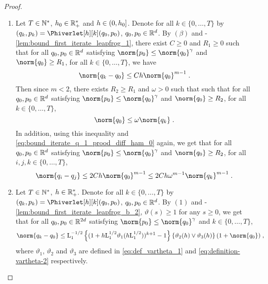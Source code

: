 \begin{proof}
\begin{enumerate}[label=(\roman*),leftmargin=0cm,itemindent=0.5cm,labelwidth=1.2\itemindent,labelsep=0cm,align=left]
\item
Let $T \in \mathbb{N}^{*}$, $h_0 \in \mathbb{R}_+^*$ and  $h \in \left(0,h_0\right]$.
Denote for all $k \in \{0,\ldots,T\}$ by $(q_k,p_k) =
  \Phiverlet[h][k](q_0,p_0)$, $q_0, p_0 \in \mathbb{R}^d$.
  By  $(\beta)$ and  -\ref{lem:bound_first_iterate_leapfrog_1}, there exist $C \geq 0$ and  $R_1 \geq 0$ such that for all $q_0,p_0 \in \mathbb{R}^d$ satisfying $ \norm{\p_0} \leq \norm{\q_0}^{\gamma}$ and $\norm{\q_0} \geq R_1$, for all $k \in \{0,\ldots,T\}$, we have
\begin{equation}\label{eq:bound_iterate_q_1_prood_diff_ham_0}
 \norm{\q_k-\q_0} \leq C h \norm{\q_0}^{\m-1} \eqsp.
\end{equation}
Then since $m<2$, there exists $R_2 \geq R_1$ and $\omega >0$ such that such that for all $q_0,p_0 \in \mathbb{R}^d$ satisfying $ \norm{p_0} \leq \norm{\q_0}^{\gamma}$  and $\norm{\q_0} \geq R_2$, for all $k \in \{0,\ldots,T\}$,
\begin{equation}
  \norm{\q_0} \leq \omega \norm{\q_k} \eqsp.
\end{equation}
In addition, using this inequality and
\eqref{eq:bound_iterate_q_1_prood_diff_ham_0} again, we get that for
all $q_0,p_0 \in \mathbb{R}^d$ satisfying $ \norm{p_0} \leq
\norm{\q_0}^{\gamma}$ and $\norm{\q_0} \geq R_2$, for all $i,j,k \in
\{0,\ldots,T\}$,
\begin{equation}
\label{eq:bound_iterate_q_2_prood_diff_ham_2}
\norm{\q_{i}-\q_{j}} \leq 2C h \norm{\q_0}^{\m-1} \leq 2 Ch \omega^{\m-1}\norm{\q_k}^{\m-1}  \eqsp.
\end{equation}
%
\item Let $T \in \mathbb{N}^{*}$, $h \in \mathbb{R}_+^*$.
Denote for all $k \in \{0,\ldots,T\}$ by $(q_k,p_k) =
  \Phiverlet[h][k](q_0,p_0)$, $q_0, p_0 \in \mathbb{R}^d$.
 By  $(1)$ and -\ref{lem:bound_first_iterate_leapfrog_b_2}, $\vartheta(s) \geq 1$ for any $s \geq 0$, we get that  for all $q_0, p_0 \in \mathbb{R}^{2d}$ satisfying $\norm{\p_0} \leq \norm{\q_0}^\gamma$ and $k \in \{0,\ldots,T\}$,
\begin{equation}\label{eq:bound_iterate_q_1_prood_diff_ham_0_m_2}
 \norm{\q_k-\q_0} \leq \constzero^{-1/2}\left\{(1 + h \constzero^{1/2} \vartheta_1(h \constzero^{1/2}))^{k+1}-1\right\} \left\{ \vartheta_2(h) \vee \vartheta_3(h) \right\} (1 + \norm{\q_0}) \eqsp,
\end{equation}
where $\vartheta_1$, $\vartheta_2$ and $\vartheta_3$ are defined in \eqref{eq:def_vartheta_1} and  \eqref{eq:definition-vartheta-2} respectively.


\end{enumerate}
\end{proof}
